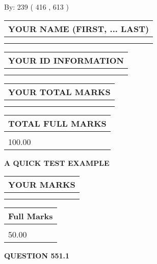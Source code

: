 \documentclass[12pt]{article}
\begin{document}
   
\hspace{1.0in} By: 
 239 ( 416 ,  613 )
   
   
   
   
\newpage 
\setcounter{page}{ 
   551001 } 
   
   
   
   
\noindent\begin{tabular}{|l|}
\hline
YOUR NAME (FIRST, ... LAST)  \\
\hline
 \\ 
 \\ 
\hline
\end{tabular}
\hspace{0.05in} \begin{tabular}{|l|}
\hline
 YOUR   ID   INFORMATION  \\
\hline
 \\ 
 \\ 
\hline
\end{tabular}
   
   
\vspace{0.2in}\noindent\begin{tabular}{|l|}
\hline
YOUR TOTAL MARKS  \\
\hline
 \\ 
 \\ 
\hline
\end{tabular}
\hspace{0.05in} \begin{tabular}{|l|}
\hline
TOTAL FULL MARKS  \\
\hline
 \\ 
100.00 \\
\hline
\end{tabular}
   
   
 \vspace{0.2in}
{\LARGE {\textbf{ A QUICK TEST EXAMPLE}}}
   
   
  
\vspace{0.2in}
  
\noindent\begin{tabular}{|l|}
\hline
 YOUR MARKS  \\
\hline
 \\ 
 \\ 
\hline
\end{tabular}
\hspace{0.05in} \begin{tabular}{|l|}
\hline
 Full Marks  \\
\hline
 \\ 
50.00 \\
\hline
\end{tabular}
{\textbf{\Large{QUESTION
551.1 
}}}
  
\end{document}
